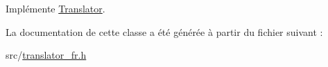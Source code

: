 Implémente \hyperlink{class_translator_a31e719b4e290a359ddbb78132bf3f494}{Translator}.



La documentation de cette classe a été générée à partir du fichier suivant \+:\begin{DoxyCompactItemize}
\item 
src/\hyperlink{translator__fr_8h}{translator\+\_\+fr.\+h}\end{DoxyCompactItemize}
